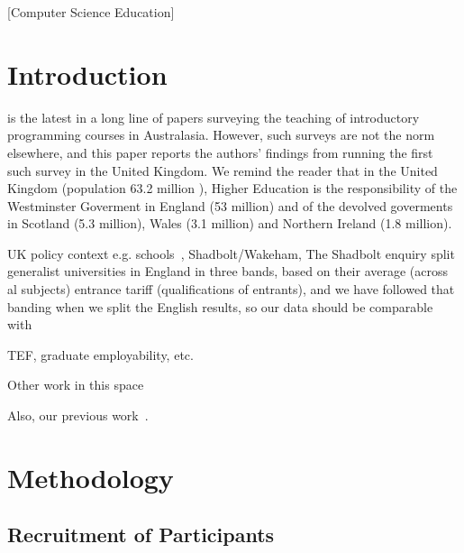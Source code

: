 \documentclass{sig-alternate}
\begin{document}
[Computer Science Education]

\section{Introduction}\label{intro}

\cite{mason+cooper:2014} is the latest in a long line \cite{deraadt-et-al:2004,mason-et-al:2012} of papers surveying the teaching of introductory programming courses in Australasia. However, such surveys are not the norm elsewhere, and this paper reports the authors' findings from running the first such survey in the United Kingdom. We remind the reader that in the United Kingdom (population 63.2 million \cite{Census}), Higher Education is the responsibility of the Westminster Goverment in England (53 million) and of the devolved goverments in Scotland (5.3 million), Wales (3.1 million) and Northern Ireland (1.8 million).

UK policy context
e.g. schools~\cite{brown-et-al-sigcse2013,brown-et-al-toce2014},
Shadbolt/Wakeham,
The Shadbolt enquiry split generalist universities in England in three bands, based on their average (across al subjects) entrance tariff (qualifications of entrants), and we have followed that banding when we split the English results, so our data should be comparable with \cite{shadbolt:2016}

 TEF, graduate employability, etc.

Other work in this
space~\cite{mccracken-et-al:2001,gupta:2004,dale:2006,pears-et-al:2007,guo:2014}

Also, our previous work~\cite{crick-et-al-hea:2015,davenport-et-al:latice2016}.


\section{Methodology}\label{method}

\subsection{Recruitment of Participants}
\end{document}
